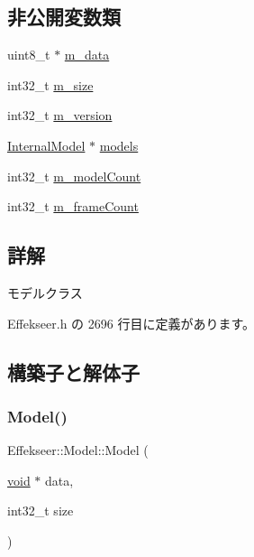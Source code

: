 \subsection*{非公開変数類}
\begin{DoxyCompactItemize}
\item 
uint8\+\_\+t $\ast$ \mbox{\hyperlink{class_effekseer_1_1_model_ad5772e9423e411e5a08c51a9c30049d3}{m\+\_\+data}}
\item 
int32\+\_\+t \mbox{\hyperlink{class_effekseer_1_1_model_a0304caaed0dc96f15ff484fc7f569fd2}{m\+\_\+size}}
\item 
int32\+\_\+t \mbox{\hyperlink{class_effekseer_1_1_model_a8f676999665b3600465018b2d9edcb21}{m\+\_\+version}}
\item 
\mbox{\hyperlink{struct_effekseer_1_1_model_1_1_internal_model}{Internal\+Model}} $\ast$ \mbox{\hyperlink{class_effekseer_1_1_model_a59187b8fbbf43644cbbd782f7b2eea92}{models}}
\item 
int32\+\_\+t \mbox{\hyperlink{class_effekseer_1_1_model_a31858493b5e9e55b6172b92eacac1ea3}{m\+\_\+model\+Count}}
\item 
int32\+\_\+t \mbox{\hyperlink{class_effekseer_1_1_model_a49e0dc4694aaae95444144089544e53a}{m\+\_\+frame\+Count}}
\end{DoxyCompactItemize}


\subsection{詳解}
モデルクラス 

 Effekseer.\+h の 2696 行目に定義があります。



\subsection{構築子と解体子}
\mbox{\label{class_effekseer_1_1_model_a6e13732e632a25f8368b698b9c21e61d}} 
\subsubsection{\texorpdfstring{Model()}{Model()}}
{\footnotesize\ttfamily Effekseer\+::\+Model\+::\+Model (\begin{DoxyParamCaption}\item[{\mbox{\hyperlink{namespace_effekseer_ab34c4088e512200cf4c2716f168deb56}{void}} $\ast$}]{data,  }\item[{int32\+\_\+t}]{size }\end{DoxyParamCaption})\hspace{0.3cm}{\ttfamily [inline]}}



